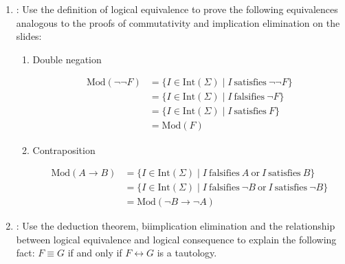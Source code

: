 \documentclass[solution]{acAssignment}
\begin{document}
\begin{enumerate}
    \item {}:
        Use the definition of logical equivalence to prove the following equivalences analogous to the proofs of commutativity and implication elimination on the slides:
        \begin{enumerate}
            \item Double negation
            
                \begin{acSolution}
                    \begin{align}
                        \mathrm{Mod}(\lnot \lnot F)
                            &= \{I \in \mathrm{Int}(\Sigma) \mid I ~\mathrm{satisfies}~ \lnot \lnot F\} \\
                            &= \{I \in \mathrm{Int}(\Sigma) \mid I ~\mathrm{falsifies}~ \lnot F\} \\
                            &= \{I \in \mathrm{Int}(\Sigma) \mid I ~\mathrm{satisfies}~ F\} \\
                            &= \mathrm{Mod}(F)
                    \end{align}
                \end{acSolution}
            
            \item Contraposition
            
                \begin{acSolution}
                    \begin{align}
                        \mathrm{Mod}(A \to B)
                            &= \{I \in \mathrm{Int}(\Sigma) \mid I ~\mathrm{falsifies}~ A ~\mathrm{or}~ I ~\mathrm{satisfies}~ B\} \\
                            &= \{I \in \mathrm{Int}(\Sigma) \mid I ~\mathrm{falsifies}~ \lnot B ~\mathrm{or}~ I ~\mathrm{satisfies}~ \lnot B\} \\
                            &= \mathrm{Mod}(\lnot B \to \lnot A)
                    \end{align}
                \end{acSolution}
        \end{enumerate}
        
    \item {}:
        Use the deduction theorem, biimplication elimination and the relationship between logical equivalence and logical consequence to explain the following fact: $F \equiv G$ if and only if $F \leftrightarrow G$ is a tautology.
        

\end{enumerate}
\end{document}

